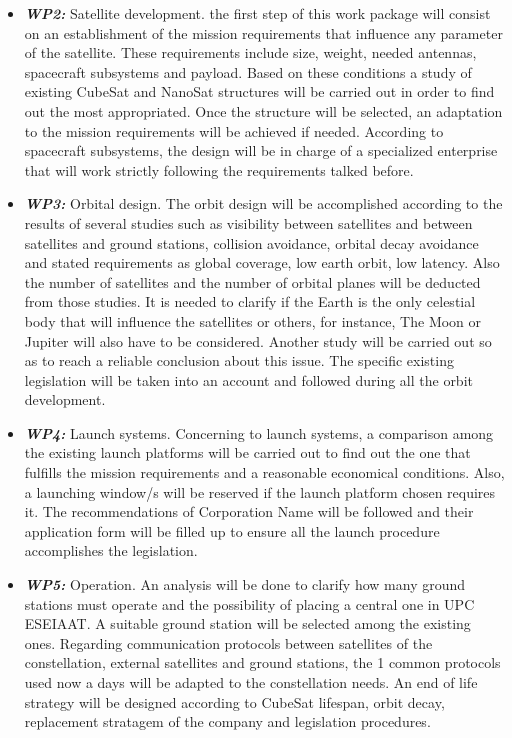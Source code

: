 \documentclass[12pt, titlepage]{scrartcl}
\begin{document}
\begin{itemize}
\item \textit{\textbf{WP2:}} Satellite development. the first step of this work package will
consist on an establishment of the mission requirements that influence
any parameter of the satellite. These requirements include size, weight,
needed antennas, spacecraft subsystems and payload. Based on these
conditions a study of existing CubeSat and NanoSat structures will
be carried out in order to find out the most appropriated. Once the
structure will be selected, an adaptation to the mission requirements
will be achieved if needed. According to spacecraft subsystems, the
design will be in charge of a specialized enterprise that will work strictly
following the requirements talked before.

\item \textit{\textbf{WP3:}} Orbital design. The orbit design will be accomplished according
to the results of several studies such as visibility between satellites
and between satellites and ground stations, collision avoidance, orbital
decay avoidance and stated requirements as global coverage, low earth
orbit, low latency. Also the number of satellites and the number of orbital
planes will be deducted from those studies. It is needed to clarify
if the Earth is the only celestial body that will influence the satellites
or others, for instance, The Moon or Jupiter will also have to be considered.
Another study will be carried out so as to reach a reliable
conclusion about this issue. The specific existing legislation will be
taken into an account and followed during all the orbit development.

\item \textit{\textbf{WP4:}} Launch systems. Concerning to launch systems, a comparison
among the existing launch platforms will be carried out to find
out the one that fulfills the mission requirements and a reasonable economical
conditions. Also, a launching window/s will be reserved if the
launch platform chosen requires it. The recommendations of Corporation
Name will be followed and their application form will be filled
up to ensure all the launch procedure accomplishes the legislation.

\item \textit{\textbf{WP5:}} Operation. An analysis will be done to clarify how many
ground stations must operate and the possibility of placing a central one
in UPC ESEIAAT. A suitable ground station will be selected among
the existing ones. Regarding communication protocols between satellites
of the constellation, external satellites and ground stations, the
1
common protocols used now a days will be adapted to the constellation
needs. An end of life strategy will be designed according to
CubeSat lifespan, orbit decay, replacement stratagem of the company
and legislation procedures.


\end{itemize}
\end{document}

